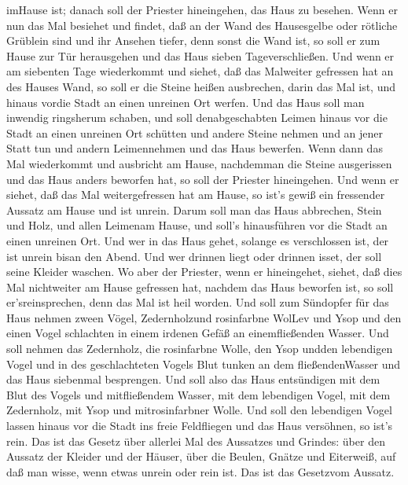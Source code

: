imHause ist; danach soll der Priester hineingehen, das Haus zu besehen.
 Wenn er nun das Mal besiehet und findet, daß an der Wand
des Hausesgelbe oder rötliche Grüblein sind und ihr Ansehen tiefer, denn
sonst die Wand ist,  so soll er zum Hause zur Tür
herausgehen und das Haus sieben Tageverschließen.  Und wenn
er am siebenten Tage wiederkommt und siehet, daß das Malweiter gefressen
hat an des Hauses Wand,  so soll er die Steine heißen
ausbrechen, darin das Mal ist, und hinaus vordie Stadt an einen unreinen
Ort werfen.  Und das Haus soll man inwendig ringsherum
schaben, und soll denabgeschabten Leimen hinaus vor die Stadt an einen
unreinen Ort schütten  und andere Steine nehmen und an
jener Statt tun und andern Leimennehmen und das Haus bewerfen.
 Wenn dann das Mal wiederkommt und ausbricht am Hause,
nachdemman die Steine ausgerissen und das Haus anders beworfen hat,
 so soll der Priester hineingehen. Und wenn er siehet, daß
das Mal weitergefressen hat am Hause, so ist's gewiß ein fressender
Aussatz am Hause und ist unrein.  Darum soll man das Haus
abbrechen, Stein und Holz, und allen Leimenam Hause, und soll's
hinausführen vor die Stadt an einen unreinen Ort.  Und wer
in das Haus gehet, solange es verschlossen ist, der ist unrein bisan den
Abend.  Und wer drinnen liegt oder drinnen isset, der soll
seine Kleider waschen.  Wo aber der Priester, wenn er
hineingehet, siehet, daß dies Mal nichtweiter am Hause gefressen hat,
nachdem das Haus beworfen ist, so soll er'sreinsprechen, denn das Mal
ist heil worden.  Und soll zum Sündopfer für das Haus
nehmen zween Vögel, Zedernholzund rosinfarbne WolLev und Ysop
 und den einen Vogel schlachten in einem irdenen Gefäß an
einemfließenden Wasser.  Und soll nehmen das Zedernholz,
die rosinfarbne Wolle, den Ysop undden lebendigen Vogel und in des
geschlachteten Vogels Blut tunken an dem fließendenWasser und das Haus
siebenmal besprengen.  Und soll also das Haus entsündigen
mit dem Blut des Vogels und mitfließendem Wasser, mit dem lebendigen
Vogel, mit dem Zedernholz, mit Ysop und mitrosinfarbner Wolle.
 Und soll den lebendigen Vogel lassen hinaus vor die Stadt
ins freie Feldfliegen und das Haus versöhnen, so ist's rein.
 Das ist das Gesetz über allerlei Mal des Aussatzes und
Grindes:  über den Aussatz der Kleider und der Häuser,
 über die Beulen, Gnätze und Eiterweiß,  auf
daß man wisse, wenn etwas unrein oder rein ist. Das ist das Gesetzvom
Aussatz.

